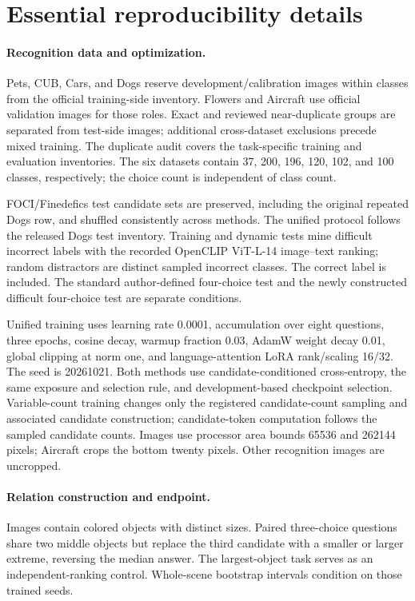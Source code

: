 \appendix
\section{Essential reproducibility details}
\label{app:essential}
\paragraph{Recognition data and optimization.}
Pets, CUB, Cars, and Dogs reserve development/calibration images within classes from the official training-side inventory. Flowers and Aircraft use official validation images for those roles. Exact and reviewed near-duplicate groups are separated from test-side images; additional cross-dataset exclusions precede mixed training. The duplicate audit covers the task-specific training and evaluation inventories. The six datasets contain 37, 200, 196, 120, 102, and 100 classes, respectively; the choice count is independent of class count.

FOCI/Finedefics test candidate sets are preserved, including the original repeated Dogs row, and shuffled consistently across methods. The unified protocol follows the released Dogs test inventory. Training and dynamic tests mine difficult incorrect labels with the recorded OpenCLIP ViT-L-14 image--text ranking; random distractors are distinct sampled incorrect classes. The correct label is included. The standard author-defined four-choice test and the newly constructed difficult four-choice test are separate conditions.

Unified training uses learning rate 0.0001, accumulation over eight questions, three epochs, cosine decay, warmup fraction 0.03, AdamW weight decay 0.01, global clipping at norm one, and language-attention LoRA rank/scaling 16/32. The seed is 20261021. Both methods use candidate-conditioned cross-entropy, the same exposure and selection rule, and development-based checkpoint selection. Variable-count training changes only the registered candidate-count sampling and associated candidate construction; candidate-token computation follows the sampled candidate counts. Images use processor area bounds 65536 and 262144 pixels; Aircraft crops the bottom twenty pixels. Other recognition images are uncropped.

\paragraph{Relation construction and endpoint.}
Images contain colored objects with distinct sizes. Paired three-choice questions share two middle objects but replace the third candidate with a smaller or larger extreme, reversing the median answer. The largest-object task serves as an independent-ranking control.  Whole-scene bootstrap intervals condition on those trained seeds.

